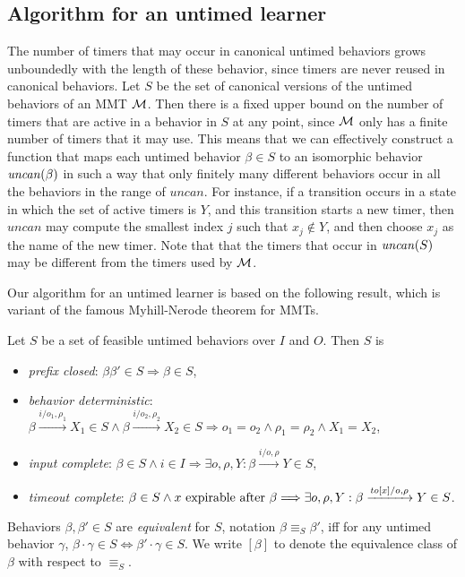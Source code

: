 \subsection{Algorithm for an untimed learner}
The number of timers that may occur in canonical untimed behaviors grows unboundedly with the length of these behavior,
since timers are never reused in canonical behaviors.
Let $S$ be the set of canonical versions of the untimed behaviors of an MMT ${\cal M}$.
Then there is a fixed upper bound on the number of timers that are active in a behavior in $S$ at any point,
since ${\cal M}$ only has a finite number of timers that it may use.
This means that we can effectively construct a function that maps each untimed behavior $\beta \in S$
to an isomorphic behavior $\mathit{uncan}({\beta})$ in such a way that only finitely many
different behaviors occur in all the behaviors in the range of $\mathit{uncan}$.
For instance, if a transition occurs in a state in which the set of active timers is $Y$, and this transition
starts a new timer, then $\mathit{uncan}$ may compute the smallest index $j$
such that $x_j \not\in Y$, and then choose $x_j$ as the name of the new timer.
Note that that the timers that occur in $\mathit{uncan}({S})$ may be different from the timers used by ${\cal M}$.

Our algorithm for an untimed learner is based on the following result, which is variant of the famous 
Myhill-Nerode theorem for MMTs.

\begin{definition}
Let $S$ be a set of feasible untimed behaviors over $I$ and $O$. Then $S$ is
\begin{itemize}
\item
\emph{prefix closed}: $\beta \beta' \in S \Longrightarrow \beta \in S$,
\item
\emph{behavior deterministic}:
$\beta \xrightarrow{i/o_1, \rho_1} X_1 \in S \wedge \beta \xrightarrow{i/o_2, \rho_2} X_2 \in S \Longrightarrow o_1 = o_2 \wedge \rho_1 = \rho_2 \wedge X_1 = X_2$,
\item
\emph{input complete}:
$\beta \in S \wedge i \in I \Longrightarrow \exists o, \rho, Y : \beta \xrightarrow{i/o, \rho} Y \in S$,
\item
\emph{timeout complete}:
$\beta \in S \wedge x \mbox{ expirable after } \beta \Longrightarrow
\exists o, \rho, Y: \beta \xrightarrow{\mathit{to}[x]/o, \rho} Y \in S$.
\end{itemize}
Behaviors $\beta, \beta' \in S$ are \emph{equivalent} for $S$, notation $\beta \equiv_S \beta'$, iff 
for any untimed behavior
$\gamma$, $\beta \cdot \gamma \in S \Leftrightarrow \beta' \cdot \gamma \in S$.
We write $[\beta]$ to denote the equivalence class of $\beta$ with respect to $\equiv_S$.
\end{definition}

